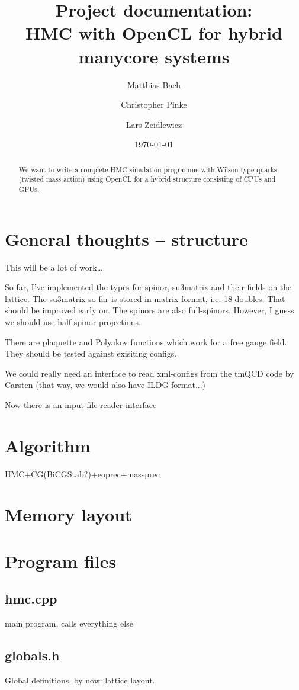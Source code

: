\documentclass[a4paper,11pt]{article}
\title{Project documentation:\\
       \textbf{HMC with OpenCL for hybrid manycore systems}
}
\author{Matthias Bach \and Christopher Pinke \and Lars Zeidlewicz}
\date{\today}
\begin{document}
\maketitle
\begin{abstract}
We want to write a complete HMC simulation programme with Wilson-type quarks (twisted mass action) using OpenCL for a hybrid structure consisting of CPUs and GPUs.
\end{abstract}

\tableofcontents

\section{General thoughts -- structure}
This will be a lot of work\ldots

So far, I've implemented the types for spinor, su3matrix and their fields on the lattice. The su3matrix so far is stored in matrix format, i.e. 18 doubles. That should be improved early on. The spinors are also full-spinors. However, I guess we should use half-spinor projections.

There are plaquette and Polyakov functions which work for a free gauge field. They should be tested against exisiting configs.

We could really need an interface to read xml-configs from the tmQCD code by Carsten (that way, we would also have ILDG format...)

Now there is an input-file reader interface

\section{Algorithm}
HMC+CG(BiCGStab?)+eoprec+massprec

\section{Memory layout}

\section{Program files}
\subsection{hmc.cpp}
main program, calls everything else
\subsection{globals.h}
Global definitions, by now: lattice layout.
\end{document}
